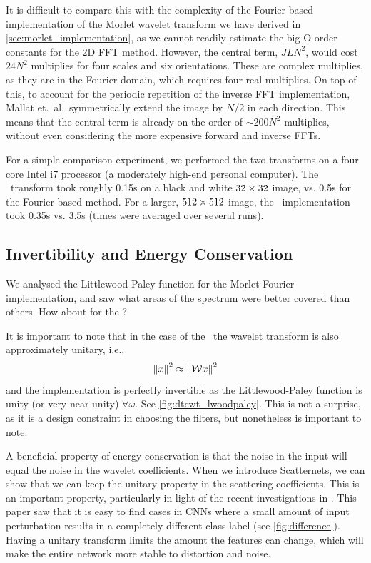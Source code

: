   It is difficult to compare this with the complexity of the Fourier-based
  implementation of the Morlet wavelet transform we have derived in
  \autoref{sec:morlet_implementation}, as we cannot readily estimate the big-O
  order constants for the 2D FFT method. However, the central term, $JLN^2$,
  would cost $24N^2$ multiplies for four scales and six orientations. These are
  complex multiplies, as they are in the Fourier domain, which requires
  four real multiplies. On top of this, to account for the periodic repetition 
  of the inverse FFT implementation, Mallat et.\ al.\ symmetrically extend the image by
  $N/2$ in each direction. This means that the central term is already on the
  order of $\sim 200N^2$ multiplies, without even considering the more
  expensive forward and inverse FFTs. 

  For a simple comparison experiment, we performed the two transforms on a four
  core Intel i7 processor (a moderately high-end personal computer). The
  \DTCWT\ transform took roughly 0.15s on a black and
  white $32\times 32$ image, vs. 0.5s for the Fourier-based method. For a larger,
  $512\times 512$ image, the \DTCWT\ implementation took 0.35s vs. 3.5s
  (times were averaged over several runs).
  
\subsection{Invertibility and Energy Conservation}
  We analysed the Littlewood-Paley function for the Morlet-Fourier
  implementation, and saw what areas of the spectrum were better covered than
  others. How about for the \DTCWT\@?

  It is important to note that in the case of the \DTCWT\, the wavelet
  transform is also approximately unitary, i.e.,\
  \begin{equation}
    \left\lVert x \right\rVert^2 \approx \left\lVert \mathcal{W}x \right\rVert^2
  \end{equation}
  and the implementation is perfectly invertible as the Littlewood-Paley
  function is unity (or very near unity) $\forall \omega$. See
  \autoref{fig:dtcwt_lwoodpaley}. This is not a surprise, as it is a design
  constraint in choosing the filters, but nonetheless is important to note. 

  A beneficial property of energy conservation is that the noise in the input
  will equal the noise in the wavelet coefficients. When we introduce
  Scatternets, we can show that we can keep the unitary property in the
  scattering coefficients. This is an important property, particularly in light
  of the recent investigations in \citep{szegedy_intriguing_2013}. This paper
  saw that it is easy to find cases in CNNs where a small amount of input
  perturbation results in a completely different class label (see
  \autoref{fig:difference}). Having a unitary transform limits the
  amount the features can change, which will make the entire network more
  stable to distortion and noise.

